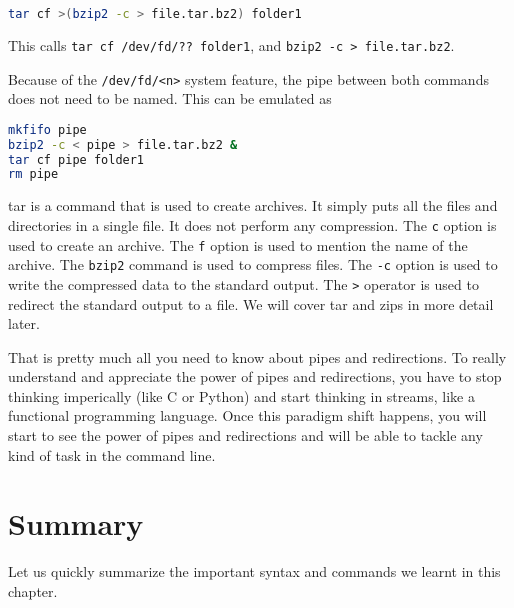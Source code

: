 \begin{lstlisting}[language=bash]
tar cf >(bzip2 -c > file.tar.bz2) folder1
\end{lstlisting}

This calls \lstinline|tar cf /dev/fd/?? folder1|,
and \lstinline|bzip2 -c > file.tar.bz2|.


Because of the \lstinline|/dev/fd/<n>| system feature,
the pipe between both commands does not need to be named.
This can be emulated as

\begin{lstlisting}[language=bash]
mkfifo pipe
bzip2 -c < pipe > file.tar.bz2 &
tar cf pipe folder1
rm pipe
\end{lstlisting}

\begin{remark}
  tar is a command that is used to create archives.
  It simply puts all the files and directories in a single file.
  It does not perform any compression. The \lstinline|c| option is
  used to create an archive. The \lstinline|f| option is used to
  mention the name of the archive. The \lstinline|bzip2| command
  is used to compress files. The \lstinline|-c| option is used to
  write the compressed data to the standard output. The \lstinline|>|
  operator is used to redirect the standard output to a file.
  We will cover tar and zips in more detail later.
\end{remark}

That is pretty much all you need to know about pipes and redirections.
To really understand and appreciate the power of pipes and redirections,
you have to stop thinking imperically (like C or Python) and start
thinking in streams, like a functional programming language.
Once this paradigm shift happens, you will start to see the power
of pipes and redirections and will be able to tackle any kind of
task in the command line.

\vfill
\pagebreak
\section{Summary}

Let us quickly summarize the important syntax and commands we learnt
in this chapter.

